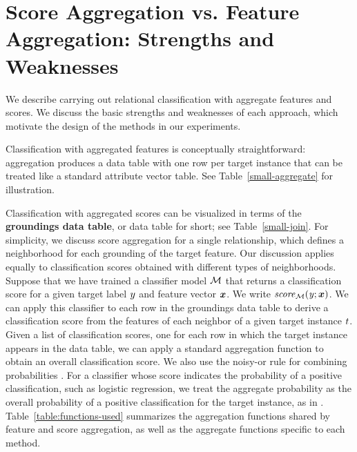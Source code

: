 \documentclass[conference]{IEEEtran}
\begin{document}
\section{Score Aggregation vs. Feature Aggregation: Strengths and Weaknesses} \label{sec:proscons} We describe carrying out relational classification with aggregate features and scores. We discuss the basic strengths and weaknesses of each approach, which motivate the design of the methods in our experiments.

Classification with aggregated features is conceptually straightforward: aggregation produces a data table with one row per target instance that can be treated like a standard attribute vector table. See Table~\ref{small-aggregate} for illustration.

Classification with aggregated scores can be visualized in terms of the \textbf{groundings data table}, or data table for short; see Table~\ref{small-join}. For simplicity, we discuss score aggregation for a single relationship, which defines a neighborhood for each grounding of the target feature. Our discussion applies equally to classification scores obtained with different types of neighborhoods.
%
Suppose that we have trained a classifier model $\mathcal{M}$ that returns a classification score for a given target label $y$ and feature vector $\boldsymbol{x}$. We write $\it{score}_{\mathcal{M}}(y;\boldsymbol{x})$. We can apply this classifier to each row in the groundings data table to derive a classification score from the features of each neighbor of a given target instance $t$.
%
Given a list of classification scores, one for each row in which the target instance appears in the data table, we can apply a standard aggregation function to obtain an overall classification score. We also use the noisy-or rule for combining probabilities \cite{Kersting2007}. For a classifier whose score indicates the probability of a positive classification, such as logistic regression, we treat the aggregate probability as the overall probability of a positive classification for the target instance, as in \cite{Neville2003}.
Table~\ref{table:functions-used} summarizes the aggregation functions shared by feature and score aggregation, as well as the aggregate functions specific to each method.
%
\end{document}
